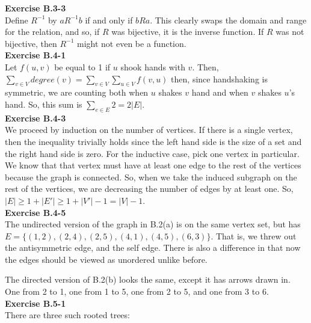 \documentclass{article}
\begin{document}
\noindent\textbf{Exercise B.3-3}\\
Define $R^{-1}$ by $a R^{-1} b$ if and only if $b R a$. This clearly swaps the domain and range for the relation, and so, if $R$ was bijective, it is the inverse function. If $R$ was not bijective, then $R^{-1}$ might not even be a function.\\

\noindent\textbf{Exercise B.4-1}\\
Let $f(u,v)$ be equal to 1 if $u$ shook hands with $v$. Then, $\sum_{v\in V} degree(v) = \sum_{v\in V} \sum_{u\in V} f(v,u)$ then, since handshaking is symmetric, we are counting both when $u$ shakes $v$ hand and when $v$ shakes $u$'s hand. So, this sum is $\sum_{e\in E} 2 = 2|E|$.\\

\noindent\textbf{Exercise B.4-3}\\
We proceed by induction on the number of vertices. If there is a single vertex, then the inequality trivially holds since the left hand side is the size of a set and the right hand side is zero. For the inductive case, pick one vertex in particular. We know that that vertex must have at least one edge to the rest of the vertices because the graph is connected. So, when we take the induced subgraph on the rest of the vertices, we are decreasing the number of edges by at least one. So, $|E| \ge 1+ |E'| \ge 1+ |V'| -1 = |V| -1$.\\

\noindent\textbf{Exercise B.4-5}\\
The undirected version of the graph in B.2(a) is on the same vertex set, but has $E =\{(1,2),(2,4),(2,5),(4,1),(4,5),(6,3)\}$. That is, we threw out the antisymmetric edge, and the self edge. There is also a difference in that now the edges should be viewed as unordered unlike before.

The directed version of B.2(b) looks the same, except it has arrows drawn in. One from 2 to 1, one from 1 to 5, one from 2 to 5, and one from 3 to 6.\\

\noindent\textbf{Exercise B.5-1}\\
There are three such rooted trees:

\end{document}
